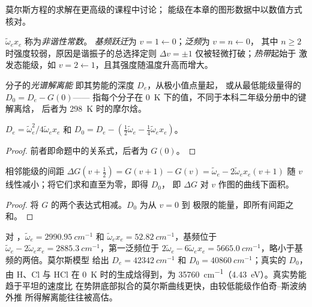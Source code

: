 莫尔斯方程的求解在更高级的课程中讨论；
能级在本章的图形数据中以数值方式核对。

\begin{definition}\label{def:b3:rovibrational-spectroscopy:anharmonic}
$\tilde\omega_ex_e$ 称为\emph{非谐性常数}。
\emph{基频跃迁}为
$v = 1 \leftarrow 0$；\emph{泛频}为 $v = n \leftarrow 0$，
其中 $n \ge 2$ 时强度较弱，原因是谐振子的总选择定则 $\Delta v = \pm1$
仅被轻微打破；\emph{热带}起始于
激发态能级，如 $v = 2 \leftarrow 1$，且其强度随温度升高而增大。
\end{definition}

\begin{definition}[光谱解离能]\label{def:b3:rovibrational-spectroscopy:dissociation}
分子的\emph{光谱解离能}
即其势能的深度 $D_e$，从极小值点量起，
或从最低能级量得的 $D_0 = D_e - G(0)$——
指每个分子在 \qty{0}{K} 下的值，不同于本科二年级分册中的键解离焓，
后者为 \qty{298}{K} 时的摩尔焓。
\end{definition}

\begin{corollary}[莫尔斯振子的 $D_e$ 与 $D_0$]\label{cor:b3:rovibrational-spectroscopy:de}
$D_e = \tilde\omega_e^2/4\tilde\omega_ex_e$ 和 $D_0 = D_e - (\frac12\tilde\omega_e -
\frac14\tilde\omega_ex_e)$。
\end{corollary}

\begin{proof}
前者即命题中的关系式，后者为 $G(0)$。
\end{proof}

\begin{proposition}[伯奇–斯波纳外推法]\label{prop:b3:rovibrational-spectroscopy:birge-sponer}
相邻能级的间距 $\Delta G(v + \frac12) = G(v+1) - G(v) = \tilde\omega_e - 2\tilde\omega_ex_e(v +
1)$ 随 $v$ 线性减小；将它们求和直至为零，即得 $D_0$，
即 $\Delta G$ 对 $v$ 作图的曲线下面积。
\end{proposition}

\begin{proof}
将 $G$ 的两个表达式相减。$D_0$ 为从 $v = 0$ 到
极限的能量，即所有间距之和。
\end{proof}

\begin{example}[氯化氢]\label{ex:b3:rovibrational-spectroscopy:hcl}
对 ，$\tilde\omega_e = \qty{2990.95}{cm^{-1}}$ 和 $\tilde\omega_ex_e =
\qty{52.82}{cm^{-1}}$，基频位于 $\tilde\omega_e - 2\tilde\omega_ex_e =
\qty{2885.3}{cm^{-1}}$，第一泛频位于 $2\tilde\omega_e - 6\tilde\omega_ex_e =
\qty{5665.0}{cm^{-1}}$，略小于基频的两倍。莫尔斯模型
给出 $D_e = \qty{42342}{cm^{-1}}$ 和 $D_0 = \qty{40860}{cm^{-1}}$；真实的 $D_0$，
由 H、Cl 与 HCl 在 \qty{0}{K} 时的生成焓得到，为
\qty{35760}{cm^{-1}}（\qty{4.43}{eV}）。真实势能趋于平坦的速度比
在势阱底部拟合的莫尔斯曲线更快，由较低能级作伯奇–斯波纳外推
所得解离能往往被高估。
\end{example}

